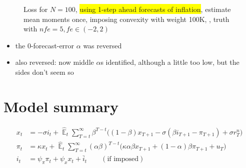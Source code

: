 \documentclass[11pt]{article}
\def \myFigPath {../../figures/}
\renewcommand{\[}{\begin{equation}}
\renewcommand{\]}{\end{equation}}
\DeclareMathOperator{\E}{\mathbb{E}}
\newcommand\blankpage{%
    \null
    \thispagestyle{empty}%
    \addtocounter{page}{-1}%
    \newpage}
\begin{document}
\begin{figure}[h!]
\caption{Loss for $N=100$, \colorbox{yellow}{using 1-step ahead forecasts of inflation}, estimate mean moments once, imposing convexity with weight 100K, , truth with $nfe=5, fe \in(-2,2)$}
\end{figure}

\begin{itemize}
\item the 0-forecast-error $\alpha$ was reversed
\item also reversed: now middle $\alpha$s identified, although a little too low, but the sides don't seem so
\end{itemize}

\afterpage{\blankpage}


    \clearpage
\appendix
\section{Model summary}

\vspace{-0.5cm}

\begin{align}
x_t &=  -\sigma i_t +\hat{\E}_t \sum_{T=t}^{\infty} \beta^{T-t }\big( (1-\beta)x_{T+1} - \sigma(\beta i_{T+1} - \pi_{T+1}) +\sigma r_T^n \big)  \label{A1}  \\
\pi_t &= \kappa x_t +\hat{\E}_t \sum_{T=t}^{\infty} (\alpha\beta)^{T-t }\big( \kappa \alpha \beta x_{T+1} + (1-\alpha)\beta \pi_{T+1} + u_T\big) \label{A2}  \\
i_t &= \psi_{\pi}\pi_t + \psi_{x} x_t  + \bar{i}_t \label{TR} \quad \quad (\text{if imposed})
\end{align}

\vspace{-1.2cm}
\end{document}
